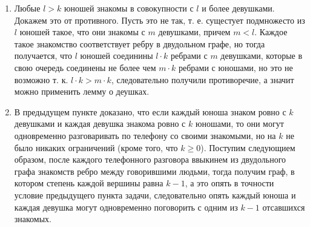 \documentclass[a4paper,12pt]{article}
\begin{document}
\begin{Proof}
\begin{enumerate}
\item Любые $l>k$ юношей знакомы в совокупности с $l$ и более девушками. Докажем это от противного. Пусть это не так, т. е. сущестует подмножесто из $l$ юношей такое, что они знакомы с $m$ девушками, причем $m<l$. Каждое такое знакомство соответствует ребру в двудольном графе, но тогда получается, что $l$ юношей соединины $l \cdot k$ ребрами с $m$ девушками, которые в свою очередь соединены не более чем $m \cdot k$ ребрами с юношами, но это не возможно т. к. $l \cdot k > m \cdot k$, следовательно получили противоречие, а значит можно применить лемму о деушках.

\item В предыдущем пункте доказано, что если каждый юноша знаком ровно с $k$ девушками и каждая девушка знакома ровно с $k$ юношами, то они могут одновременно разговаривать по телефону со своими знакомыми, но на $k$ не было никаких ограничений (кроме того, что $k \ge 0$). Поступим следующием образом, после каждого телефонного разговора ввыкинем из двудольного графа знакомств ребро между говорившими людьми, тогда получим граф, в котором степень каждой вершины равна $k-1$, а это опять в точности условие предыдущего пункта задачи, следовательно опять каждый юноша и каждая девушка могут одновременно поговорить с одним из $k-1$ отсавшихся знакомых.
\end{enumerate}
\end{Proof}
\end{document}
